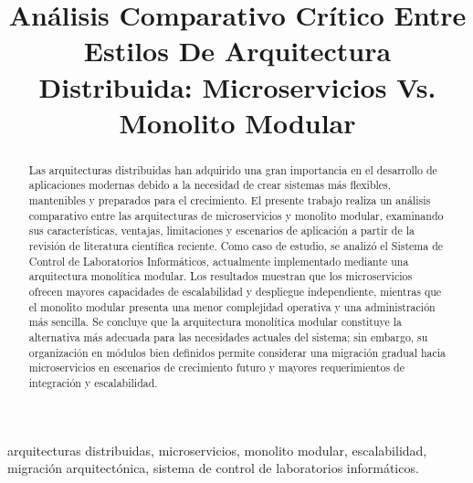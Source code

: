 \documentclass[10pt,conference]{IEEEtran}
\begin{document}
\title{Análisis Comparativo Crítico Entre Estilos De Arquitectura Distribuida: Microservicios Vs. Monolito Modular}

\author{
}

\maketitle

\begin{abstract}
Las arquitecturas distribuidas han adquirido una gran importancia en el desarrollo de aplicaciones modernas debido a la necesidad de crear sistemas más flexibles, mantenibles y preparados para el crecimiento. El presente trabajo realiza un análisis comparativo entre las arquitecturas de microservicios y monolito modular, examinando sus características, ventajas, limitaciones y escenarios de aplicación a partir de la revisión de literatura científica reciente. Como caso de estudio, se analizó el Sistema de Control de Laboratorios Informáticos, actualmente implementado mediante una arquitectura monolítica modular. Los resultados muestran que los microservicios ofrecen mayores capacidades de escalabilidad y despliegue independiente, mientras que el monolito modular presenta una menor complejidad operativa y una administración más sencilla. Se concluye que la arquitectura monolítica modular constituye la alternativa más adecuada para las necesidades actuales del sistema; sin embargo, su organización en módulos bien definidos permite considerar una migración gradual hacia microservicios en escenarios de crecimiento futuro y mayores requerimientos de integración y escalabilidad.
\end{abstract}

\begin{IEEEkeywords}
arquitecturas distribuidas, microservicios, monolito modular, escalabilidad, migración arquitectónica, sistema de control de laboratorios informáticos.
\end{IEEEkeywords}
\end{document}
